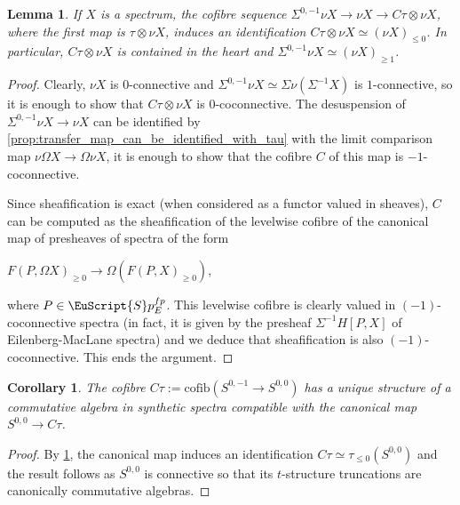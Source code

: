 \documentclass[oneside,a4paper]{amsart}
\newcommand{\euscr}[1]{\EuScript{#1}} %
\newcommand{\spectra}{\euscr{S}p} %
\theoremstyle{plain}
\newtheorem{lemma}[thm]{Lemma}
\newtheorem{cor}[thm]{Corollary}
\theoremstyle{definition}
\theoremstyle{remark}
\begin{document}
\begin{lemma}
\label{lemma:tensoring_with_cofibre_of_tau_a_discretization_on_representable_connective_synthetic_spectra}
If $X$ is a spectrum, the cofibre sequence $\Sigma^{0, -1} \nu X \rightarrow \nu X \rightarrow C\tau \otimes \nu X$, where the first map is $\tau \otimes \nu X$, induces an identification $C\tau \otimes \nu X \simeq (\nu X)_{\leq 0}$. In particular, $C\tau \otimes \nu X$ is contained in the heart and $\Sigma^{0, -1} \nu X \simeq (\nu X)_{\geq 1}$.
\end{lemma}

\begin{proof}
Clearly, $\nu X$ is $0$-connective and $\Sigma^{0, -1} \nu X \simeq \Sigma \nu (\Sigma^{-1} X)$ is $1$-connective, so it is enough to show that $C \tau \otimes \nu X$ is $0$-coconnective. The desuspension of $\Sigma^{0, -1} \nu X \rightarrow \nu X$ can be identified by \cref{prop:transfer_map_can_be_identified_with_tau} with the limit comparison map $\nu \Omega X \rightarrow \Omega \nu X$, it is enough to show that the cofibre $C$ of this map is $-1$-coconnective. 

Since sheafification is exact (when considered as a functor valued in sheaves), $C$ can be computed as the sheafification of the levelwise cofibre of the canonical map of presheaves of spectra of the form

\begin{center}
$F(P, \Omega X) _{\geq 0} \rightarrow \Omega (F(P, X)_{\geq 0})$,
\end{center}
where $P \in \spectra_{E}^{fp}$. This levelwise cofibre is clearly valued in $(-1)$-coconnective spectra (in fact, it is given by the presheaf $\Sigma^{-1} H[P, X]$ of Eilenberg-MacLane spectra) and we deduce that sheafification is also $(-1)$-coconnective. This ends the argument.
\end{proof}

\begin{cor}
\label{cor:ctau_is_an_algebra}
The cofibre $C\tau := \mathrm{cofib}(S^{0, -1} \rightarrow S^{0, 0})$ has a unique structure of a commutative algebra in synthetic spectra compatible with the canonical map $S^{0, 0} \rightarrow C\tau$. 
\end{cor}

\begin{proof}
By \cref{lemma:tensoring_with_cofibre_of_tau_a_discretization_on_representable_connective_synthetic_spectra}, the canonical map induces an identification $C\tau \simeq \tau_{\leq 0} (S^{0, 0})$ and the result follows as $S^{0, 0}$ is connective so that its $t$-structure truncations are canonically commutative algebras. 
\end{proof}
\end{document}
